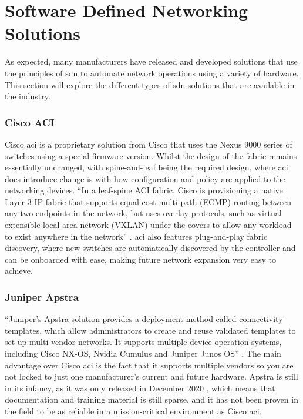 \section{Software Defined Networking Solutions}
\label{litreview:types}
As expected, many manufacturers have released and developed solutions that use the principles of \gls{sdn} to automate network operations using a variety of hardware. This section will explore the different types of \gls{sdn} solutions that are available in the industry.

\subsubsection{Cisco ACI}
Cisco \gls{aci} is a proprietary solution from Cisco that uses the Nexus 9000 series of switches using a special firmware version. Whilst the design of the fabric remains essentially unchanged, with spine-and-leaf being the required design, where \gls{aci} does introduce change is with how configuration and policy are applied to the networking devices. ``In a leaf-spine ACI fabric, Cisco is provisioning a native Layer 3 IP fabric that supports equal-cost multi-path (ECMP) routing between any two endpoints in the network, but uses overlay protocols, such as virtual extensible local area network (VXLAN) under the covers to allow any workload to exist anywhere in the network'' \citep{duffy2014cisco}. \gls{aci} also features plug-and-play fabric discovery, where new switches are automatically discovered by the controller and can be onboarded with ease, making future network expansion very easy to achieve.

\subsubsection{Juniper Apstra}
``Juniper’s Apstra solution provides
a deployment method called connectivity templates, which allow administrators to create and reuse validated templates to set up multi-vendor networks. It supports multiple device operation systems, including Cisco NX-OS, Nvidia Cumulus and Juniper Junos OS'' \citep{9914530}. The main advantage over Cisco \gls{aci} is the fact that it supports multiple vendors so you are not locked to just one manufacturer's current and future hardware. Apstra is still in its infancy, as it was only released in December 2020 \citep{9914530}, which means that documentation and training material is still sparse, and it has not been proven in the field to be as reliable in a mission-critical environment as Cisco \gls{aci}.